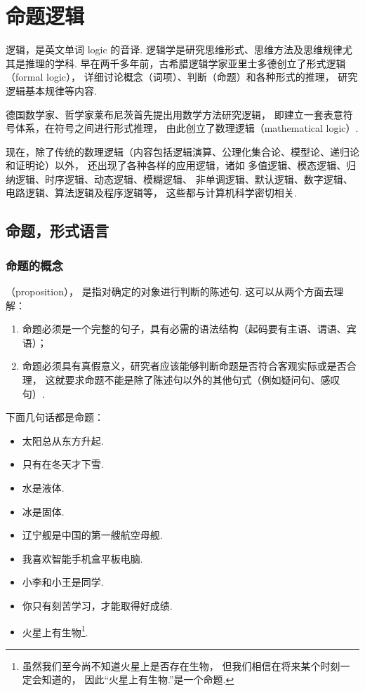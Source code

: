 \chapter{命题逻辑}
逻辑，是英文单词 logic 的音译.
逻辑学是研究思维形式、思维方法及思维规律尤其是推理的学科.
早在两千多年前，古希腊逻辑学家亚里士多德创立了形式逻辑（formal logic），
详细讨论概念（词项）、判断（命题）和各种形式的推理，
研究逻辑基本规律等内容.

德国数学家、哲学家莱布尼茨首先提出用数学方法研究逻辑，
即建立一套表意符号体系，在符号之间进行形式推理，
由此创立了数理逻辑（mathematical logic）.

现在，除了传统的数理逻辑（内容包括逻辑演算、公理化集合论、模型论、递归论和证明论）以外，
还出现了各种各样的应用逻辑，诸如
多值逻辑、模态逻辑、归纳逻辑、时序逻辑、动态逻辑、模糊逻辑、
非单调逻辑、默认逻辑、数字逻辑、电路逻辑、算法逻辑及程序逻辑等，
这些都与计算机科学密切相关.


\section{命题，形式语言}
\subsection{命题的概念}
（proposition），
是指对确定的对象进行判断的陈述句.
这可以从两个方面去理解：\begin{enumerate}
	\item 命题必须是一个完整的句子，具有必需的语法结构（起码要有主语、谓语、宾语）；
	\item 命题必须具有真假意义，研究者应该能够判断命题是否符合客观实际或是否合理，
	这就要求命题不能是除了陈述句以外的其他句式（例如疑问句、感叹句）.
\end{enumerate}

下面几句话都是命题：\begin{itemize}
	\item 太阳总从东方升起.
	\item 只有在冬天才下雪.
	\item 水是液体.
	\item 冰是固体.
	\item 辽宁舰是中国的第一艘航空母舰.
	\item 我喜欢智能手机盒平板电脑.
	\item 小李和小王是同学.
	\item 你只有刻苦学习，才能取得好成绩.
	\item 火星上有生物\footnote{
		虽然我们至今尚不知道火星上是否存在生物，
		但我们相信在将来某个时刻一定会知道的，
		因此“火星上有生物.”是一个命题.
	}.
\end{itemize}

